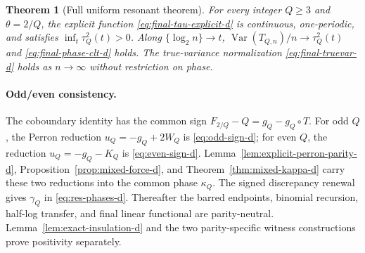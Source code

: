 \documentclass[11pt]{article}
\numberwithin{equation}{section}
\newtheorem{theorem}{Theorem}[section]
\newcommand{\Var}{\operatorname{Var}}\newcommand{\Cov}{\operatorname{Cov}}
\newcommand{\1}{\mathbf 1}\newcommand{\F}{\mathcal F}\newcommand{\D}{\mathcal D}
\begin{document}
\begin{theorem}[Full uniform resonant theorem]\label{thm:final-uniform-resonant-d}
For every integer $Q\ge3$ and $\theta=2/Q$, the explicit function
\eqref{eq:final-tau-explicit-d} is continuous, one-periodic, and satisfies
$\inf_t\tau_Q^2(t)>0$.  Along $\{\log_2n\}\to t$,
$\Var(T_{Q,n})/n\to\tau_Q^2(t)$ and \eqref{eq:final-phase-clt-d} holds.
The true-variance normalization \eqref{eq:final-truevar-d} holds as
$n\to\infty$ without restriction on phase.
\end{theorem}

\paragraph{Odd/even consistency.}
The coboundary identity has the common sign
$F_{2/Q}-Q=g_Q-g_Q\circ T$.  For odd $Q$, the Perron reduction
$u_Q=-g_Q+2W_Q$ is \eqref{eq:odd-sign-d}; for even $Q$, the reduction
$u_Q=-g_Q-K_Q$ is \eqref{eq:even-sign-d}.  Lemma~\ref{lem:explicit-perron-parity-d},
Proposition~\ref{prop:mixed-force-d}, and Theorem~\ref{thm:mixed-kappa-d}
carry these two reductions into the common phase $\kappa_Q$.  The signed
discrepancy renewal gives $\gamma_Q$ in \eqref{eq:res-phases-d}.  Thereafter
the barred endpoints, binomial recursion, half-log transfer, and final linear
functional are parity-neutral.  Lemma~\ref{lem:exact-insulation-d} and the
two parity-specific witness constructions prove positivity separately.
\end{document}

